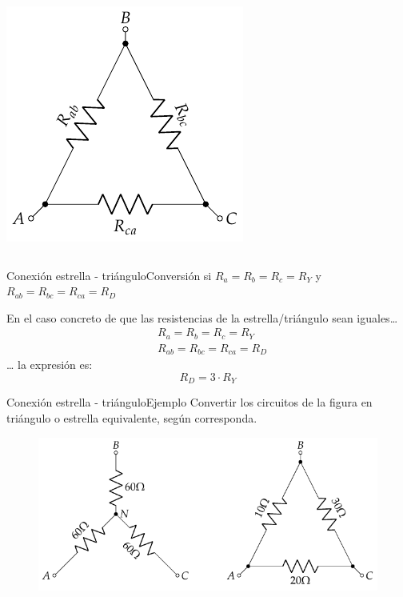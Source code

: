 \documentclass[aspectratio=169, xcolor={usenames,svgnames,dvipsnames}]{beamer}
\begin{document}
\begin{frame}
\begin{columns}
\begin{column}{0.3\columnwidth}
\begin{center}
\includegraphics[width=.9\linewidth]{../figs/Conexion_Triangulo.pdf}
\end{center}
\end{column}
\end{columns}
\end{frame}

\begin{frame}{Conexión estrella - triángulo}{Conversión si $R_a=R_b=R_c=R_Y$ y $R_{ab}=R_{bc}=R_{ca}=R_D$}
    
    En el caso concreto de que las resistencias de la estrella/triángulo sean \alert{iguales}\ldots{}
\begin{align*}
  &R_a=R_b=R_c=R_Y\\
  & R_{ab}=R_{bc}=R_{ca}=R_D
\end{align*}
\ldots{} la expresión es:
\begin{equation*}
  \boxed{R_{D} = 3\cdot R_Y}
\end{equation*}
\end{frame}

\begin{frame}{Conexión estrella - triángulo}{Ejemplo}
    Convertir los circuitos de la figura en triángulo o estrella equivalente, según corresponda. 
 \begin{figure}[H]
 		\centering
\includegraphics{../figs/ej7_BT1.pdf}
 	\end{figure}
\end{frame}
\end{document}
